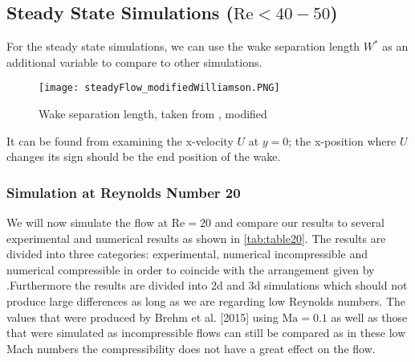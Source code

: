 	\subsection{Steady State Simulations ($\text{Re} < 40-50$)}
	For the steady state simulations, we can use the wake separation length $W^*$ as an additional variable to compare to other simulations.
			\begin{figure}[htp]
				\centering
				\texttt{[image: steadyFlow\_modifiedWilliamson.PNG]}
				\caption{Wake separation length, taken from \cite{williamson1996vortex}, modified }
				\label{fig:wakeSeparation}
			\end{figure} 
	It can be found from examining the x-velocity $U$ at $y=0$; the x-position where $U$ changes its sign should be the end position of the wake.

	\subsubsection{Simulation at Reynolds Number 20}
	We will now simulate the flow at $\text{Re}=20$ and compare our results to several experimental and numerical results as shown in \cref{tab:table20}. The results are divided into three categories: experimental, numerical incompressible and numerical compressible in order to coincide with the arrangement given by \textcite{ayers}.Furthermore the results are divided into \gls{2d} and \gls{3d} simulations which should not produce large differences as long as we are regarding low Reynolds numbers. The values that were produced by Brehm et al. [2015] using $\text{Ma} = 0.1$ as well as those that were simulated as incompressible flows can still be compared as in these low Mach numbers the compressibility does not have a great effect on the flow.


